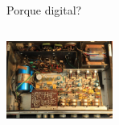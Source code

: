 \documentclass{beamer}
\begin{document}
\begin{darkframes}
\begin{frame}{Porque digital?}
\begin{columns}[onlytextwidth]
               \includegraphics[width=35mm]{1_clase/transistor_amp}
      \end{columns}
    \end{frame}



\end{darkframes}
\end{document}
